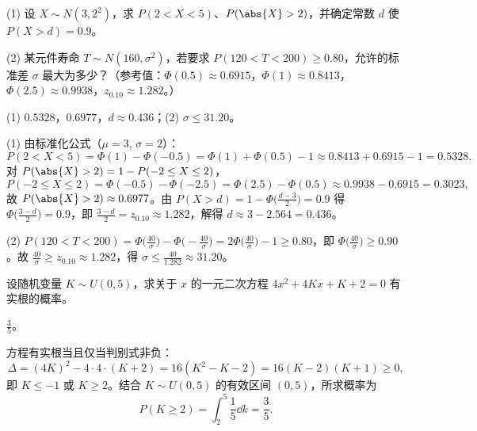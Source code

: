\begin{exercise}[title={正态分布的区间概率与参数反求},level=standard,points=8,tags={正态分布,分位点}]
(1) 设 $X\sim N(3,2^2)$，求 $P(2<X<5)$、$P(\abs{X}>2)$，并确定常数 $d$ 使 $P(X>d)=0.9$。

(2) 某元件寿命 $T\sim N(160,\sigma^2)$，若要求 $P(120<T<200)\ge 0.80$，允许的标准差 $\sigma$ 最大为多少？（参考值：$\Phi(0.5)\approx 0.6915$，$\Phi(1)\approx 0.8413$，$\Phi(2.5)\approx 0.9938$，$z_{0.10}\approx 1.282$。）
\begin{answer}
(1) $0.5328$，$0.6977$，$d\approx 0.436$；(2) $\sigma\le 31.20$。
\end{answer}
\begin{solution}
(1) 由标准化公式（$\mu=3,\,\sigma=2$）：
\[
  P(2<X<5)=\Phi(1)-\Phi(-0.5)=\Phi(1)+\Phi(0.5)-1\approx 0.8413+0.6915-1=0.5328.
\]
对 $P(\abs{X}>2)=1-P(-2\le X\le 2)$，
\[
  P(-2\le X\le 2)=\Phi(-0.5)-\Phi(-2.5)=\Phi(2.5)-\Phi(0.5)\approx 0.9938-0.6915=0.3023,
\]
故 $P(\abs{X}>2)\approx 0.6977$。由 $P(X>d)=1-\Phi\bigl(\frac{d-3}{2}\bigr)=0.9$ 得 $\Phi\bigl(\frac{3-d}{2}\bigr)=0.9$，即 $\frac{3-d}{2}=z_{0.10}\approx 1.282$，解得 $d\approx 3-2.564=0.436$。

(2) $P(120<T<200)=\Phi\bigl(\frac{40}{\sigma}\bigr)-\Phi\bigl(-\frac{40}{\sigma}\bigr)=2\Phi\bigl(\frac{40}{\sigma}\bigr)-1\ge 0.80$，即 $\Phi\bigl(\frac{40}{\sigma}\bigr)\ge 0.90$。故 $\frac{40}{\sigma}\ge z_{0.10}\approx 1.282$，得 $\sigma\le\frac{40}{1.282}\approx 31.20$。
\end{solution}
\end{exercise}

\begin{exercise}[title={均匀分布与二次方程实根},level=standard,points=8,tags={均匀分布,综合建模}]
设随机变量 $K\sim U(0,5)$，求关于 $x$ 的一元二次方程 $4x^2+4Kx+K+2=0$ 有实根的概率。
\begin{answer}
$\frac{3}{5}$。
\end{answer}
\begin{solution}
方程有实根当且仅当判别式非负：
\[
  \Delta=(4K)^2-4\cdot 4\cdot(K+2)=16(K^2-K-2)=16(K-2)(K+1)\ge 0,
\]
即 $K\le -1$ 或 $K\ge 2$。结合 $K\sim U(0,5)$ 的有效区间 $(0,5)$，所求概率为
\[
  P(K\ge 2)=\int_{2}^{5}\frac{1}{5}\dd k=\frac{3}{5}.
\]
\end{solution}
\end{exercise}

